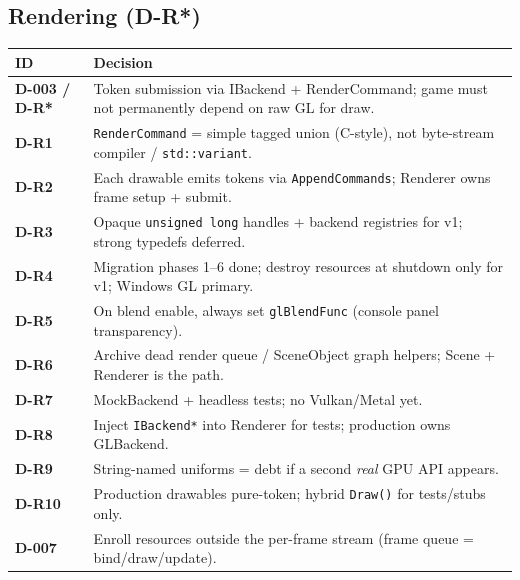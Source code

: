 \documentclass[10pt,a4paper]{article}
\begin{document}
\subsection{Rendering (D-R*)}
\begin{table}[h!]
\centering
\small
\begin{tabularx}{\textwidth}{l X}
\toprule
\textbf{ID} & \textbf{Decision} \\
\midrule
\textbf{D-003 / D-R*} & Token submission via IBackend + RenderCommand; game must not permanently depend on raw GL for draw. \\
\textbf{D-R1} & \texttt{RenderCommand} = simple tagged union (C-style), not byte-stream compiler / \texttt{std::variant}. \\
\textbf{D-R2} & Each drawable emits tokens via \texttt{AppendCommands}; Renderer owns frame setup + submit. \\
\textbf{D-R3} & Opaque \texttt{unsigned long} handles + backend registries for v1; strong typedefs deferred. \\
\textbf{D-R4} & Migration phases 1--6 done; destroy resources at shutdown only for v1; Windows GL primary. \\
\textbf{D-R5} & On blend enable, always set \texttt{glBlendFunc} (console panel transparency). \\
\textbf{D-R6} & Archive dead render queue / SceneObject graph helpers; Scene + Renderer is the path. \\
\textbf{D-R7} & MockBackend + headless tests; no Vulkan/Metal yet. \\
\textbf{D-R8} & Inject \texttt{IBackend*} into Renderer for tests; production owns GLBackend. \\
\textbf{D-R9} & String-named uniforms = debt if a second \textit{real} GPU API appears. \\
\textbf{D-R10} & Production drawables pure-token; hybrid \texttt{Draw()} for tests/stubs only. \\
\textbf{D-007} & Enroll resources outside the per-frame stream (frame queue = bind/draw/update). \\
\bottomrule
\end{tabularx}
\end{table}
\end{document}
